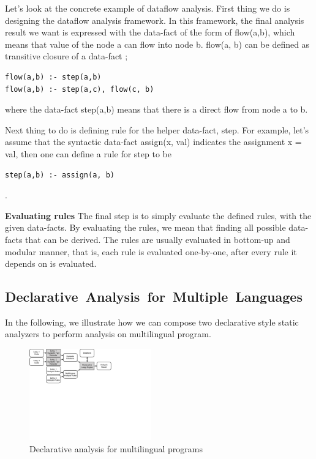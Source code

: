 Let's look at the concrete example of dataflow analysis. First thing we do is
designing the dataflow analysis framework.  In this framework, the final
analysis result we want is expressed with the data-fact of the form of
flow(a,b), which means that value of the node a can flow into node b. flow(a,
b) can be defined as transitive closure of a data-fact ;

\begin{lstlisting}[style=myDatalog,xleftmargin=2.5em]
flow(a,b) :- step(a,b)
flow(a,b) :- step(a,c), flow(c, b)
\end{lstlisting}
where the data-fact step(a,b) means that there is a direct flow from node a to b.

Next thing to do is defining rule for the helper data-fact, step.  For example,
let's assume that the syntactic data-fact assign(x, val) indicates the assignment
x = val, then one can define a rule for step to be
\begin{lstlisting}[style=myDatalog,xleftmargin=2.5em]
step(a,b) :- assign(a, b)
\end{lstlisting}
.


\textbf{Evaluating rules}
The final step is to simply evaluate the defined rules, with the given
data-facts.  By evaluating the rules, we mean that finding all possible
data-facts that can be derived. The rules are usually evaluated in bottom-up
and modular manner, that is, each rule is evaluated one-by-one, after every
rule it depends on is evaluated.

\subsection{\mbox{Declarative Analysis for Multiple Languages}}

In the following, we illustrate how we can compose two declarative style static analyzers
to perform analysis on multilingual program.

\begin{figure}[t]
  \centering
  \vspace{2mm}
  \includegraphics[width=0.47\textwidth]{img/overview2}
  \caption{Declarative analysis for multilingual programs}
  \label{fig:overview2}
\end{figure}

